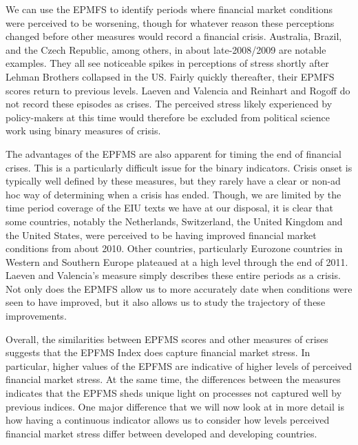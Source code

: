 \documentclass[]{article}
\begin{document}
We can use the EPMFS to identify periods where financial market
conditions were perceived to be worsening, though for whatever reason these perceptions changed before other measures would record a financial crisis. Australia, Brazil, and the Czech Republic, among others, in about late-2008/2009 are notable examples. They all see noticeable spikes in perceptions of stress shortly after Lehman Brothers collapsed in the US. Fairly quickly thereafter, their EPMFS scores return to previous levels. Laeven and Valencia and Reinhart and Rogoff do not record these episodes as crises. The perceived stress likely experienced by policy-makers at this time would therefore be excluded from political science work using binary measures of crisis.

The advantages of the EPFMS are also apparent for timing the end of financial crises. This is a particularly difficult issue for the binary indicators. Crisis onset is typically well defined by these measures, but they rarely have a clear or non-ad hoc way of determining when a crisis has ended. Though, we are limited by the time period coverage of the EIU texts we have at our disposal, it is clear that some countries, notably the Netherlands, Switzerland, the United Kingdom and the United States, were perceived to be having improved financial market conditions from about 2010. Other countries, particularly Eurozone countries in Western and Southern Europe plateaued at a high level through the end of 2011. Laeven and Valencia's measure simply describes these entire periods as a crisis. Not only does the EPMFS allow us to more accurately date when conditions were seen to have improved, but it also allows us to study the trajectory of these improvements.

Overall, the similarities between EPFMS scores and other measures of crises suggests that the EPFMS Index does capture financial market stress. In particular, higher values of the EPFMS are indicative of higher levels of perceived financial market stress. At the same time, the differences between the measures indicates that the EPFMS sheds unique light on processes not captured well by previous indices. One major difference that we will now look at in more detail is how having a continuous indicator allows us to consider how levels perceived financial market stress differ between developed and developing countries.
\end{document}
